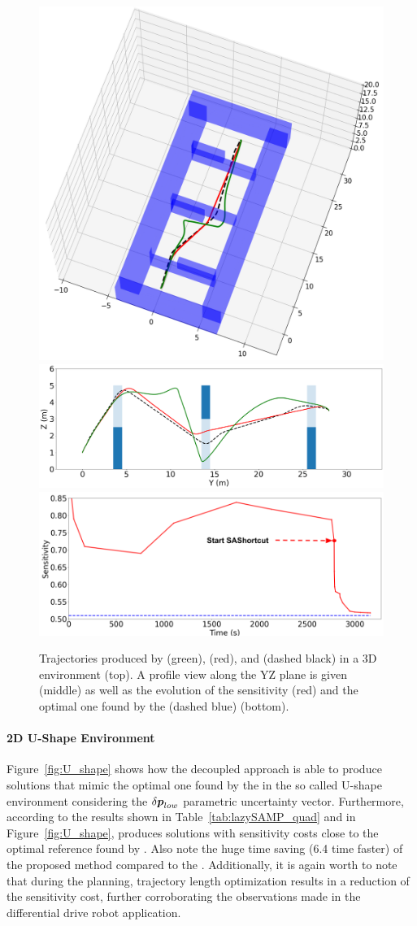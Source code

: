 \begin{figure}[h!]
    \centering
    \includegraphics[width=0.58\linewidth]{figures/samp/3D_full_view.png}
    \includegraphics[width=0.58\linewidth]{figures/samp/3D_ZYprofile.png}
    \includegraphics[width=0.58\linewidth]{figures/samp/3D_sensi.png}
    \caption{Trajectories produced by  (green),  (red), and  (dashed black) in a 3D environment (top). 
    A profile view along the YZ plane is given (middle) as well as the evolution of the sensitivity (red) and the optimal one found by the  (dashed blue) (bottom).}
    \label{fig:3D}
\end{figure}

\paragraph{2D U-Shape Environment} 

Figure~\ref{fig:U_shape} shows how the decoupled approach is able to produce solutions that mimic the optimal one found by the  in the so called U-shape environment considering the $\delta\boldsymbol{p}_{low}$ parametric uncertainty vector.
Furthermore, according to the results shown in Table~\ref{tab:lazySAMP_quad} and in Figure~\ref{fig:U_shape},  produces solutions with sensitivity costs close to the optimal reference found by . 
Also note the huge time saving (6.4 time faster) of the proposed method compared to the .
Additionally, it is again worth to note that during the  planning, trajectory length optimization results in a reduction of the sensitivity cost, further corroborating the observations made in the differential drive robot application.

